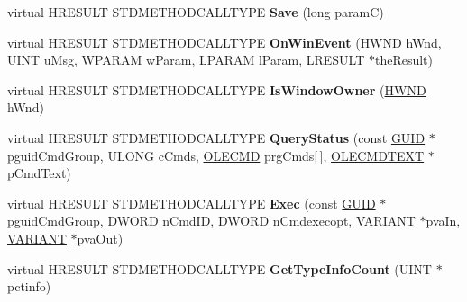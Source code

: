 \begin{DoxyCompactItemize}
\item 
\mbox{\label{class_c_address_edit_box_a621f575c7cef835a350f0a67607c5e16}} 
virtual H\+R\+E\+S\+U\+LT S\+T\+D\+M\+E\+T\+H\+O\+D\+C\+A\+L\+L\+T\+Y\+PE {\bfseries Save} (long paramC)
\item 
\mbox{\label{class_c_address_edit_box_a5a50f5d5898ba9b1f66a8e7346589965}} 
virtual H\+R\+E\+S\+U\+LT S\+T\+D\+M\+E\+T\+H\+O\+D\+C\+A\+L\+L\+T\+Y\+PE {\bfseries On\+Win\+Event} (\hyperlink{interfacevoid}{H\+W\+ND} h\+Wnd, U\+I\+NT u\+Msg, W\+P\+A\+R\+AM w\+Param, L\+P\+A\+R\+AM l\+Param, L\+R\+E\+S\+U\+LT $\ast$the\+Result)
\item 
\mbox{\label{class_c_address_edit_box_aacb618f9b76baea74df02c9f333ee35c}} 
virtual H\+R\+E\+S\+U\+LT S\+T\+D\+M\+E\+T\+H\+O\+D\+C\+A\+L\+L\+T\+Y\+PE {\bfseries Is\+Window\+Owner} (\hyperlink{interfacevoid}{H\+W\+ND} h\+Wnd)
\item 
\mbox{\label{class_c_address_edit_box_a601160361d44366527d65c15b0de26b9}} 
virtual H\+R\+E\+S\+U\+LT S\+T\+D\+M\+E\+T\+H\+O\+D\+C\+A\+L\+L\+T\+Y\+PE {\bfseries Query\+Status} (const \hyperlink{interface_g_u_i_d}{G\+U\+ID} $\ast$pguid\+Cmd\+Group, U\+L\+O\+NG c\+Cmds, \hyperlink{struct_i_ole_command_target_1_1__tag_o_l_e_c_m_d}{O\+L\+E\+C\+MD} prg\+Cmds\mbox{[}$\,$\mbox{]}, \hyperlink{struct_i_ole_command_target_1_1__tag_o_l_e_c_m_d_t_e_x_t}{O\+L\+E\+C\+M\+D\+T\+E\+XT} $\ast$p\+Cmd\+Text)
\item 
\mbox{\label{class_c_address_edit_box_a8a6fde2f1810ef732bc627f480e341cf}} 
virtual H\+R\+E\+S\+U\+LT S\+T\+D\+M\+E\+T\+H\+O\+D\+C\+A\+L\+L\+T\+Y\+PE {\bfseries Exec} (const \hyperlink{interface_g_u_i_d}{G\+U\+ID} $\ast$pguid\+Cmd\+Group, D\+W\+O\+RD n\+Cmd\+ID, D\+W\+O\+RD n\+Cmdexecopt, \hyperlink{structtag_v_a_r_i_a_n_t}{V\+A\+R\+I\+A\+NT} $\ast$pva\+In, \hyperlink{structtag_v_a_r_i_a_n_t}{V\+A\+R\+I\+A\+NT} $\ast$pva\+Out)
\item 
\mbox{\label{class_c_address_edit_box_aa3ae564c22987077aa6fe0af88713497}} 
virtual H\+R\+E\+S\+U\+LT S\+T\+D\+M\+E\+T\+H\+O\+D\+C\+A\+L\+L\+T\+Y\+PE {\bfseries Get\+Type\+Info\+Count} (U\+I\+NT $\ast$pctinfo)
\item 

\end{DoxyCompactItemize}
